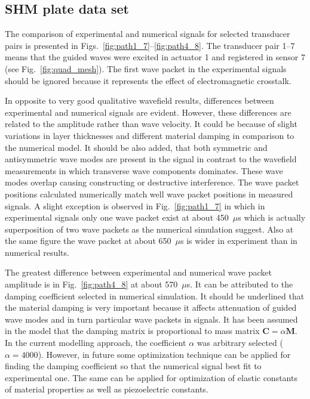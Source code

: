 \documentclass[preprint,12pt]{elsarticle}
\renewcommand{\bm}[1]{\mathbf{#1}}
\begin{document}
	\subsection{SHM plate data set}
	
	The comparison of experimental and numerical signals for selected transducer pairs is presented in Figs.~\ref{fig:path1_7}--\ref{fig:path4_8}. The transducer pair 1--7 means that the guided waves were excited in actuator 1 and registered in sensor 7 (see Fig.~\ref{fig:quad_mesh}). The first wave packet in the experimental signals should be ignored because it represents the effect of electromagnetic crosstalk.
	
	In opposite to very good qualitative wavefield results, differences between experimental and numerical signals are evident. However, these differences are related to the amplitude rather than wave velocity. It could be because of slight variations in layer thicknesses and different material damping in comparison to the numerical model. It should be also added, that both symmetric and antisymmetric wave modes are present in the signal in contrast to the wavefield measurements in which transverse wave components dominates. These wave modes overlap causing constructing or destructive interference. The wave packet positions calculated numerically match well wave packet positions in measured signals. A slight exception is observed in Fig.~\ref{fig:path1_7} in which in experimental signals only one wave packet exist at about 450~$\mu$s which is actually superposition of two wave packets as the numerical simulation suggest. Also at the same figure the wave packet at about 650~$\mu$s is wider in experiment than in numerical results. 
	
	The greatest difference between experimental and numerical wave packet amplitude is in Fig.~\ref{fig:path4_8} at about 570~$\mu$s. It can be attributed to the damping coefficient selected in numerical simulation. It should be underlined that the material damping is very important because it affects attenuation of guided wave modes and in turn particular wave packets in signals. It has been assumed in the model that the damping matrix is proportional to mass matrix $\bm{C} = \alpha \bm{M}$. In the current modelling approach, the coefficient $\alpha$ was arbitrary selected ($\alpha = 4000$). However, in future some optimization technique can be applied for finding the damping coefficient so that the numerical signal best fit to experimental one. The same can be applied for optimization of elastic constants of material properties as well as piezoelectric constants. 
	
\end{document}
